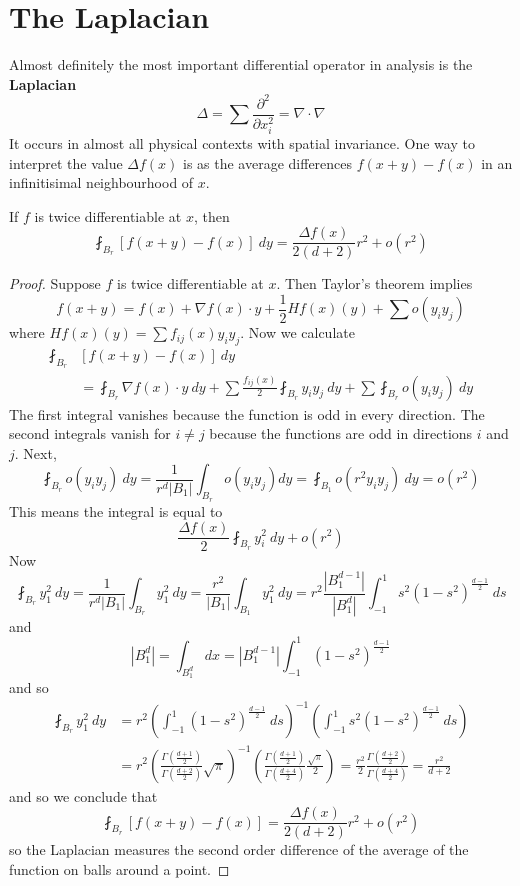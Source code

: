 \section{The Laplacian}

Almost definitely the most important differential operator in analysis is the {\bf Laplacian}
%
\[ \Delta = \sum \frac{\partial^2}{\partial x_i^2} = \nabla \cdot \nabla \]
%
It occurs in almost all physical contexts with spatial invariance. One way to interpret the value $\Delta f(x)$ is as the average differences $f(x+y) - f(x)$ in an infinitisimal neighbourhood of $x$.

\begin{theorem}
    If $f$ is twice differentiable at $x$, then
    \[ \fint_{B_r} [f(x+y) - f(x)]\ dy = \frac{\Delta f(x)}{2(d+2)} r^2 + o(r^2) \]
\end{theorem}
\begin{proof}
    Suppose $f$ is twice differentiable at $x$. Then Taylor's theorem implies
    \[ f(x + y) = f(x) + \nabla f(x) \cdot y + \frac{1}{2} Hf(x)(y) + \sum o(y_iy_j) \]
    where $Hf(x)(y) = \sum f_{ij}(x) y_iy_j$. Now we calculate
    \begin{align*}
        \fint_{B_r} &[f(x + y) - f(x)]\ dy\\
        &= \fint_{B_r} \nabla f(x) \cdot y\ dy + \sum \frac{f_{ij}(x)}{2} \fint_{B_r} y_iy_j\ dy + \sum \fint_{B_r} o(y_iy_j)\ dy
    \end{align*}
    The first integral vanishes because the function is odd in every direction. The second integrals vanish for $i \neq j$ because the functions are odd in directions $i$ and $j$. Next,
    \[ \fint_{B_r} o(y_iy_j)\ dy = \frac{1}{r^d |B_1|} \int_{B_r} o(y_iy_j) dy = \fint_{B_1} o(r^2 y_iy_j)\ dy = o(r^2) \]
    This means the integral is equal to
    \[ \frac{\Delta f(x)}{2} \fint_{B_r} y_i^2\ dy + o(r^2) \]
    Now
    \[ \fint_{B_r} y_1^2\ dy = \frac{1}{r^d |B_1|} \int_{B_r} y_1^2\ dy = \frac{r^2}{|B_1|} \int_{B_1} y_1^2\ dy = r^2 \frac{|B_1^{d-1}|}{|B_1^d|} \int_{-1}^1 s^2 (1 - s^2)^{\frac{d-1}{2}}\ ds \]
    and
    \[ |B_1^d| = \int_{B_1^d} dx = |B_1^{d-1}| \int_{-1}^1 (1 - s^2)^{\frac{d-1}{2}} \]
    and so
    \begin{align*}
        \fint_{B_r} y_1^2\ dy &= r^2 \left( \int_{-1}^1 (1 - s^2)^{\frac{d-1}{2}}\ ds \right)^{-1} \left( \int_{-1}^1 s^2 (1 - s^2)^{\frac{d-1}{2}}\ ds \right)\\
        &= r^2 \left( \frac{\Gamma( \frac{d+1}{2} )}{\Gamma ( \frac{d + 2}{2} )} \sqrt{\pi} \right)^{-1} \left( \frac{\Gamma( \frac{d+1}{2} )}{\Gamma( \frac{d + 4}{2} )} \frac{\sqrt{\pi}}{2} \right) = \frac{r^2}{2} \frac{\Gamma( \frac{d+2}{2})}{\Gamma( \frac{d+4}{2} )} = \frac{r^2}{d + 2}
    \end{align*}
    and so we conclude that
    \[ \fint_{B_r} [f(x+y) - f(x)] = \frac{\Delta f(x)}{2(d+2)} r^2 + o(r^2) \]
    so the Laplacian measures the second order difference of the average of the function on balls around a point.
\end{proof}

